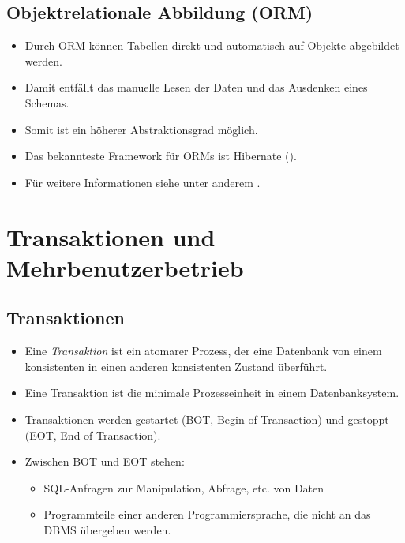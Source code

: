 	\section{Objektrelationale Abbildung (ORM)} %
		\begin{itemize}
			\item Durch ORM können Tabellen direkt und automatisch auf Objekte abgebildet werden.
			\item Damit entfällt das manuelle Lesen der Daten und das Ausdenken eines Schemas.
			\item Somit ist ein höherer Abstraktionsgrad möglich.
			\item Das bekannteste Framework für ORMs ist Hibernate ().
			\item Für weitere Informationen siehe unter anderem .
		\end{itemize}

\chapter{Transaktionen und Mehrbenutzerbetrieb} %
	\label{c:transactions}

	\section{Transaktionen} %
		\begin{itemize}
			\item Eine \textit{Transaktion} ist ein atomarer Prozess, der eine Datenbank von einem konsistenten in einen anderen konsistenten Zustand überführt.
			\item Eine Transaktion ist die minimale Prozesseinheit in einem Datenbanksystem.
			\item Transaktionen werden gestartet (BOT, Begin of Transaction) und gestoppt (EOT, End of Transaction).
			\item Zwischen BOT und EOT stehen:
				\begin{itemize}
					\item SQL-Anfragen zur Manipulation, Abfrage, etc. von Daten
					\item Programmteile einer anderen Programmiersprache, die nicht an das DBMS übergeben werden.
				\end{itemize}
		\end{itemize}

